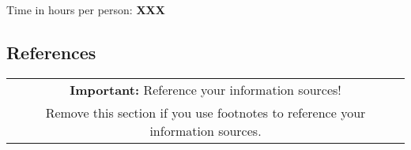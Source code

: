 \documentclass[11pt]{scrartcl}
\begin{document}
    Time in hours per person: \textbf{XXX}

    \subsection*{References}

    \begin{table}[H]
        \centering
        \begin{tabular}{c}
            \hline
            \textbf{Important:} Reference your information sources! \tabularnewline
            Remove this section if you use footnotes to reference your information sources. \tabularnewline
            \hline
        \end{tabular}
    \end{table}
\end{document}
